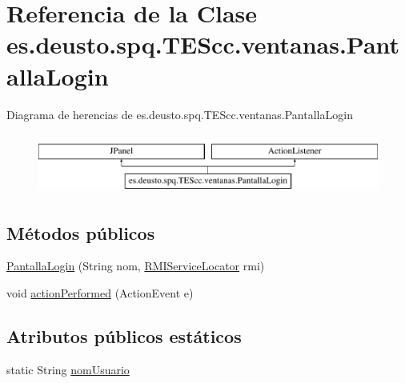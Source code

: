 \hypertarget{classes_1_1deusto_1_1spq_1_1_t_e_scc_1_1ventanas_1_1_pantalla_login}{\section{Referencia de la Clase es.\+deusto.\+spq.\+T\+E\+Scc.\+ventanas.\+Pantalla\+Login}
\label{classes_1_1deusto_1_1spq_1_1_t_e_scc_1_1ventanas_1_1_pantalla_login}
}
Diagrama de herencias de es.\+deusto.\+spq.\+T\+E\+Scc.\+ventanas.\+Pantalla\+Login\begin{figure}[H]
\begin{center}
\leavevmode
\includegraphics[height=2.000000cm]{classes_1_1deusto_1_1spq_1_1_t_e_scc_1_1ventanas_1_1_pantalla_login}
\end{center}
\end{figure}
\subsection*{Métodos públicos}
\begin{DoxyCompactItemize}
\item 
\hyperlink{classes_1_1deusto_1_1spq_1_1_t_e_scc_1_1ventanas_1_1_pantalla_login_a91c835a59a358cec2907e99fa92074de}{Pantalla\+Login} (String nom, \hyperlink{classes_1_1deusto_1_1spq_1_1_t_e_scc_1_1cliente_1_1_r_m_i_service_locator}{R\+M\+I\+Service\+Locator} rmi)
\item 
void \hyperlink{classes_1_1deusto_1_1spq_1_1_t_e_scc_1_1ventanas_1_1_pantalla_login_af46f91c7e889edf4ee1ef6a7d0f8ecd2}{action\+Performed} (Action\+Event e)
\end{DoxyCompactItemize}
\subsection*{Atributos públicos estáticos}
\begin{DoxyCompactItemize}
\item 
static String \hyperlink{classes_1_1deusto_1_1spq_1_1_t_e_scc_1_1ventanas_1_1_pantalla_login_ab8dd71abec8294c65e6fdef0655817c8}{nom\+Usuario}
\end{DoxyCompactItemize}


